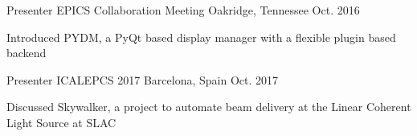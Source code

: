 \begin{cventries}
  \cventry
    {Presenter} 
    {EPICS Collaboration Meeting}
    {Oakridge, Tennessee}
    {Oct. 2016}
    {
      \begin{cvitems}
        \item {Introduced PYDM, a PyQt based display manager with a flexible plugin based backend}
      \end{cvitems}
    }
  \cventry
    {Presenter} 
    {ICALEPCS 2017}
    {Barcelona, Spain}
    {Oct. 2017}
    {
      \begin{cvitems}
        \item {Discussed Skywalker, a project to automate beam delivery at the Linear Coherent Light Source at SLAC}
      \end{cvitems}
    }
\end{cventries}
